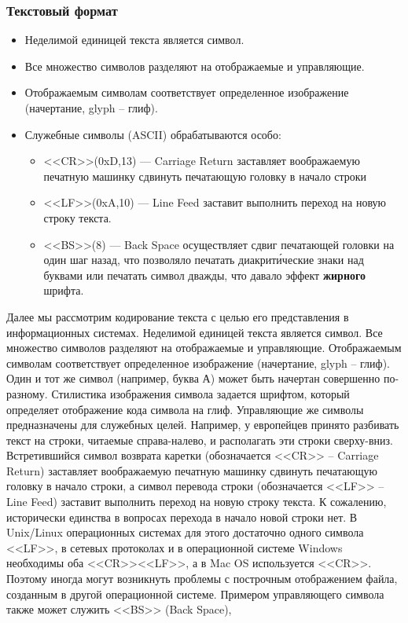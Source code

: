 \begin{frame}
    \frametitle{Текстовый формат}
    \begin{itemize}
        \item Неделимой единицей текста является символ. 
        \item Все множество символов разделяют на отображаемые и управляющие. 
        \item Отображаемым символам соответствует определенное изображение (начертание, glyph – глиф).
        \item Служебные символы (ASCII) обрабатываются особо:
        \begin{itemize}
            \item{} <<CR>>(0xD,13) --- Carriage Return заставляет воображаемую печатную машинку сдвинуть печатающую головку в начало строки
    
            \item{} <<LF>>(0xA,10) --- Line Feed заставит выполнить переход на новую строку текста. 
    
            \item{} <<BS>>(8) --- Back Space осуществляет сдвиг печатающей головки на один шаг назад, что позволяло печатать диакрит\'{и}ческие знаки над буквами или печатать символ дважды, что давало эффект {\bf{жирного}} шрифта.    
        \end{itemize}
    \end{itemize}
\end{frame}

Далее мы рассмотрим кодирование текста с целью его представления в информационных системах. Неделимой единицей текста является символ. Все множество символов разделяют на отображаемые и управляющие. Отображаемым символам соответствует определенное изображение (начертание, glyph – глиф). Один и тот же символ (например, буква А) может быть начертан совершенно по-разному. Стилистика изображения символа задается шрифтом, который определяет отображение кода символа на глиф. Управляющие же символы предназначены для служебных целей. Например, у европейцев принято разбивать текст на строки, читаемые справа-налево, и располагать эти строки сверху-вниз. Встретившийся символ возврата каретки (обозначается <<CR>> – Carriage Return) заставляет воображаемую печатную машинку сдвинуть печатающую головку в начало строки, а символ перевода строки (обозначается <<LF>> – Line Feed) заставит выполнить переход на новую строку текста. К сожалению, исторически единства в вопросах перехода в начало новой строки нет. В Unix/Linux операционных системах для этого достаточно одного символа <<LF>>, в сетевых протоколах и в операционной системе Windows необходимы оба <<CR>><<LF>>, а в Mac OS используется <<CR>>. Поэтому иногда могут возникнуть проблемы с построчным отображением файла, созданным в другой операционной системе. Примером управляющего символа также может служить <<BS>> (Back Space), 

